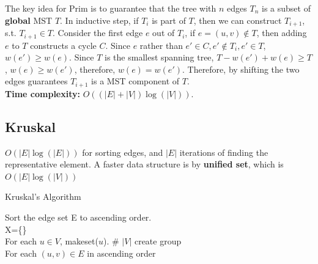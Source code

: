\documentclass{article}
\begin{document}
The key idea for Prim is to guarantee that the tree with $n$ edges $T_n$ is a subset of \textbf{global} MST $T$. 
In inductive step, if $T_{i}$ is part of $T$, then we can construct $T_{i+1}$, s.t. $T_{i+1}\in T$.
Consider the first edge $e$ out of $T_{i}$, if $e=(u,v) \notin T$, then adding $e$ to $T$ constructs a cycle $C$. 
Since $e$ rather than $e' \in C, e' \notin T_{i}, e' \in T$, $w(e')\geq w(e)$. Since $T$ is the smallest spanning tree, $T-w(e')+w(e)\geq T$, $w(e)\geq w(e')$, therefore, $w(e)=w(e')$. Therefore, by shifting the two edges guarantees $T_{i+1}$ is a MST component of $T$.\\
\textbf{Time complexity:} $O((|E|+|V|)\log(|V|))$.\\
\subsection{Kruskal}
$O(|E|\log(|E|))$ for sorting edges, and $|E|$ iterations of finding the representative element. A faster data structure is by \textbf{unified set}, which is $O(|E|\log(|V|))$ \\
\begin{algorithm}
    \caption{Kruskal's Algorithm}

    Sort the edge set E to ascending order.\\
    X=\{\}\\
    For each $u\in V$, makeset($u$).  \# $|V|$ create group\\
    For each $(u,v) \in E$ in ascending order\\
\end{algorithm}
\end{document}
